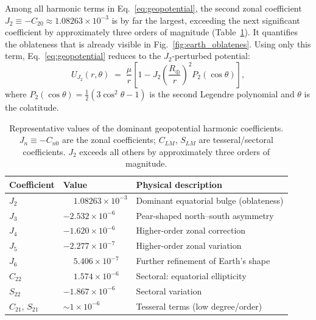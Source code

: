 Among all harmonic terms in Eq.~\ref{eq:geopotential}, the second zonal coefficient $J_2 \equiv -C_{20} \approx 1.08263 \times 10^{-3}$ is by far the largest, exceeding the next significant coefficient by approximately three orders of magnitude (Table~\ref{tab:harmonic_coefficients}). It quantifies the oblateness that is already visible in Fig.~\ref{fig:earth_oblatenes}. Using only this term, Eq.~\ref{eq:geopotential} reduces to the $J_2$-perturbed potential:
\begin{equation}
    U_{J_2}(r,\theta) \;=\; \frac{\mu}{r}\left[
        1 - J_2 \left(\frac{R_{\oplus}}{r}\right)^{\!2} P_2(\cos\theta)
    \right],
    \label{eq:potential_j2}
\end{equation}
where $P_2(\cos\theta) = \tfrac{1}{2}(3\cos^2\theta - 1)$ is the second Legendre polynomial and $\theta$ is the colatitude.

\begin{table}[H]
\centering
\caption{\footnotesize{Representative values of the dominant geopotential harmonic coefficients. $J_n \equiv -C_{n0}$ are the zonal coefficients; $C_{LM}$, $S_{LM}$ are tesseral/sectoral coefficients. $J_2$ exceeds all others by approximately three orders of magnitude. \cite{valladoFundamentalsAstrodynamicsApplications2001}}}
\label{tab:harmonic_coefficients}
\begin{tabular}{lll}
\toprule
Coefficient & Value & Physical description \\
\midrule
$J_2$            & $\phantom{-}1.08263 \times 10^{-3}$  & Dominant equatorial bulge (oblateness)     \\
$J_3$            & $-2.532 \times 10^{-6}$               & Pear-shaped north--south asymmetry         \\
$J_4$            & $-1.620 \times 10^{-6}$               & Higher-order zonal correction              \\
$J_5$            & $-2.277 \times 10^{-7}$               & Higher-order zonal variation               \\
$J_6$            & $\phantom{-}5.406 \times 10^{-7}$     & Further refinement of Earth's shape        \\
$C_{22}$         & $\phantom{-}1.574 \times 10^{-6}$     & Sectoral: equatorial ellipticity           \\
$S_{22}$         & $-1.867 \times 10^{-6}$               & Sectoral variation                         \\
$C_{21},\,S_{21}$& ${\sim}1 \times 10^{-6}$              & Tesseral terms (low degree/order)          \\
\bottomrule
\end{tabular}
\end{table}

